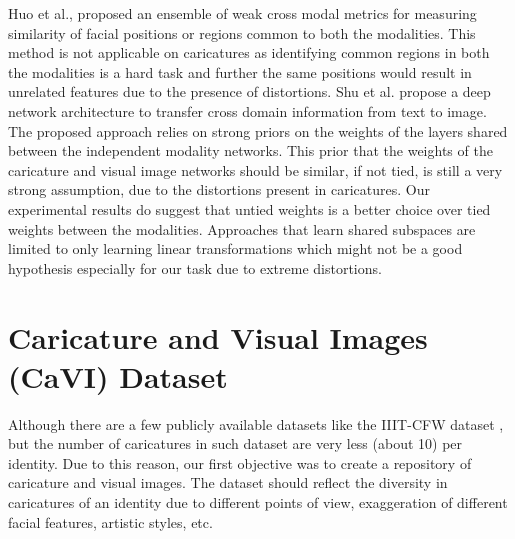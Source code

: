 Huo et al., \cite{ACM_huo_cross_modal} proposed an ensemble of weak cross modal metrics for measuring similarity of facial positions or regions common to both the modalities. This method is not applicable on caricatures as identifying common regions in both the modalities is a hard task and further the same positions would result in unrelated features due to the presence of distortions. 
Shu et al. \cite{ACM_weak_shared} propose a deep network architecture to transfer cross domain information from text to image. The proposed approach relies on strong priors on the weights of the layers shared between the independent modality networks. This prior that the weights of the caricature and visual image networks should be similar, if not tied, is still a very strong assumption, due to the distortions present in caricatures. Our experimental results do suggest that untied weights is a better choice over tied weights between the modalities. Approaches that learn shared subspaces \cite{sharedSubspace} are limited to only learning linear transformations which might not be a good hypothesis especially for our task due to extreme distortions.



\section{Caricature and Visual Images (CaVI) Dataset}

Although there are a few publicly available datasets like the IIIT-CFW dataset \cite{MishraECCV16},  but the number of caricatures in such dataset are very less (about 10) per identity. Due to this reason, our first objective was to create a repository of caricature and visual images. The dataset should reflect the diversity in caricatures of an identity due to different points of view, exaggeration of different facial features, artistic styles, etc.

